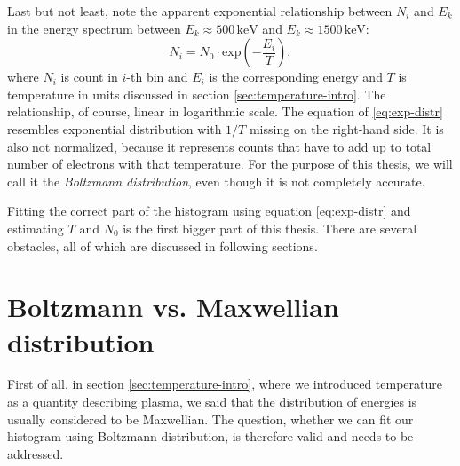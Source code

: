 Last but not least, note the apparent exponential relationship between $N_i$ and $E_k$ in the energy spectrum between $E_k \approx 500 \, \mathrm{keV}$ and $E_k \approx 1500 \, \mathrm{keV}$:
\begin{equation}
	\label{eq:exp-distr}
	N_i = N_0 \cdot \mathrm{exp}\left( -\frac{E_i}{T}\right)\mathrm{,}
\end{equation}
where $N_i$ is count in $i$-th bin and $E_i$ is the corresponding energy and $T$ is temperature in units discussed in section \ref{sec:temperature-intro}. The relationship, of course, linear in logarithmic scale. The equation of \ref{eq:exp-distr} resembles exponential distribution with $1/T$ missing on the right-hand side. It is also not normalized, because it represents counts that have to add up to total number of electrons with that temperature. For the purpose of this thesis, we will call it the \textit{Boltzmann distribution}, even though it is not completely accurate.

Fitting the correct part of the histogram using equation \ref{eq:exp-distr} and estimating $T$ and $N_0$ is the first bigger part of this thesis. There are several obstacles, all of which are discussed in following sections.

\section{Boltzmann vs. Maxwellian distribution}
First of all, in section \ref{sec:temperature-intro}, where we introduced temperature as a quantity describing plasma, we said that the distribution of energies is usually considered to be Maxwellian. The question, whether we can fit our histogram using Boltzmann distribution, is therefore valid and needs to be addressed.

